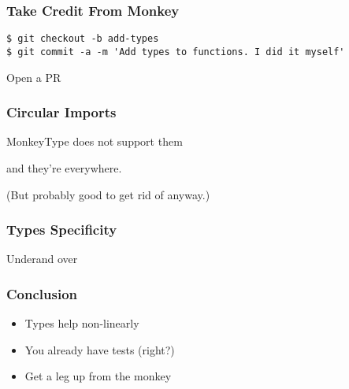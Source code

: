 \begin{frame}
\frametitle{Take Credit From Monkey}
\begin{lstlisting}
$ git checkout -b add-types
$ git commit -a -m 'Add types to functions. I did it myself'
\end{lstlisting} \pause

Open a PR
\end{frame}

\begin{frame}
\frametitle{Circular Imports}

MonkeyType does not support them\pause

and they're everywhere. \pause

(But probably good to get rid of anyway.)
\end{frame}


\begin{frame}
\frametitle{Types Specificity}

Under\pause and over

\end{frame}

\begin{frame}
\frametitle{Conclusion}

\begin{itemize}
\item Types help non-linearly
\item You already have tests (right?)
\item Get a leg up from the monkey
\end{itemize}
\end{frame}









